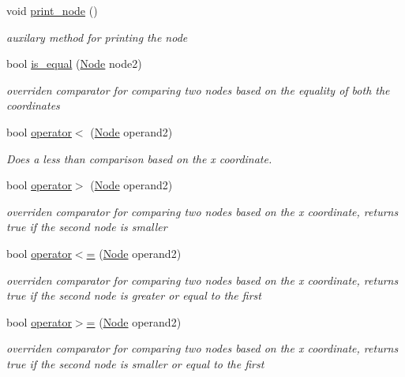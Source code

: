 \begin{DoxyCompactItemize}
\mbox{\label{classNode_aaad9d5a79f3819ba7e2ddd2b196d300f}} 
void \hyperlink{classNode_aaad9d5a79f3819ba7e2ddd2b196d300f}{print\+\_\+node} ()
\begin{DoxyCompactList}\small\item\em auxilary method for printing the node \end{DoxyCompactList}\item 
bool \hyperlink{classNode_aa93a3a9846c909197ba00bfd6fb4a549}{is\+\_\+equal} (\hyperlink{classNode}{Node} node2)
\begin{DoxyCompactList}\small\item\em overriden comparator for comparing two nodes based on the equality of both the coordinates \end{DoxyCompactList}\item 
bool \hyperlink{classNode_ab0452101dad47b23bad5419963d85648}{operator$<$} (\hyperlink{classNode}{Node} operand2)
\begin{DoxyCompactList}\small\item\em Does a less than comparison based on the x coordinate. \end{DoxyCompactList}\item 
bool \hyperlink{classNode_affe7b2f79e4364a4a37937a9b6e48861}{operator$>$} (\hyperlink{classNode}{Node} operand2)
\begin{DoxyCompactList}\small\item\em overriden comparator for comparing two nodes based on the x coordinate, returns true if the second node is smaller \end{DoxyCompactList}\item 
bool \hyperlink{classNode_af2e6eb91242511cfdc0b3e971e236602}{operator$<$=} (\hyperlink{classNode}{Node} operand2)
\begin{DoxyCompactList}\small\item\em overriden comparator for comparing two nodes based on the x coordinate, returns true if the second node is greater or equal to the first \end{DoxyCompactList}\item 
bool \hyperlink{classNode_a193b8c52f135714e5b7ca95e4516b1ff}{operator$>$=} (\hyperlink{classNode}{Node} operand2)
\begin{DoxyCompactList}\small\item\em overriden comparator for comparing two nodes based on the x coordinate, returns true if the second node is smaller or equal to the first \end{DoxyCompactList}\item 

\end{DoxyCompactItemize}

